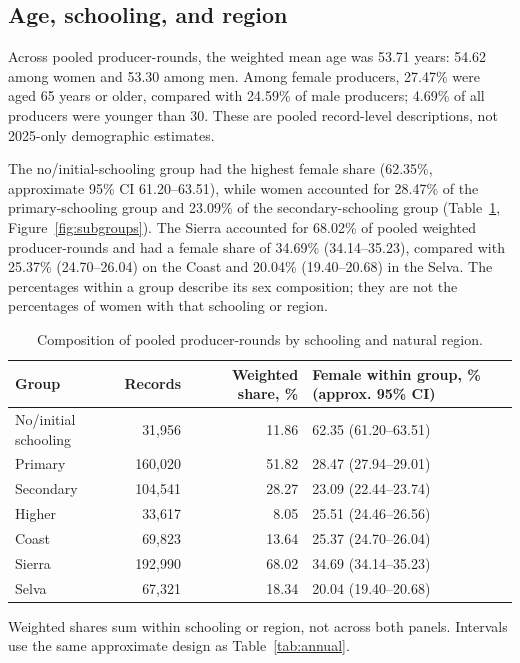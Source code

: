 \documentclass[11pt,a4paper]{article}
\begin{document}
\subsection{Age, schooling, and region}
Across pooled producer-rounds, the weighted mean age was 53.71 years: 54.62 among women and 53.30 among men. Among female producers, 27.47\% were aged 65 years or older, compared with 24.59\% of male producers; 4.69\% of all producers were younger than 30. These are pooled record-level descriptions, not 2025-only demographic estimates.

The no/initial-schooling group had the highest female share (62.35\%, approximate 95\% CI 61.20--63.51), while women accounted for 28.47\% of the primary-schooling group and 23.09\% of the secondary-schooling group (Table~\ref{tab:groups}, Figure~\ref{fig:subgroups}). The Sierra accounted for 68.02\% of pooled weighted producer-rounds and had a female share of 34.69\% (34.14--35.23), compared with 25.37\% (24.70--26.04) on the Coast and 20.04\% (19.40--20.68) in the Selva. The percentages within a group describe its sex composition; they are not the percentages of women with that schooling or region.

\begin{table}[htbp]
\centering\small
\caption{Composition of pooled producer-rounds by schooling and natural region.}
\label{tab:groups}
\begin{tabular}{lrrl}
\toprule
Group & Records & Weighted share, \% & Female within group, \% (approx. 95\% CI) \\
\midrule
No/initial schooling & 31,956 & 11.86 & 62.35 (61.20--63.51) \\
Primary & 160,020 & 51.82 & 28.47 (27.94--29.01) \\
Secondary & 104,541 & 28.27 & 23.09 (22.44--23.74) \\
Higher & 33,617 & 8.05 & 25.51 (24.46--26.56) \\
\midrule
Coast & 69,823 & 13.64 & 25.37 (24.70--26.04) \\
Sierra & 192,990 & 68.02 & 34.69 (34.14--35.23) \\
Selva & 67,321 & 18.34 & 20.04 (19.40--20.68) \\
\bottomrule
\end{tabular}
\begin{minipage}{0.94\textwidth}\footnotesize\vspace{2mm}
Weighted shares sum within schooling or region, not across both panels. Intervals use the same approximate design as Table~\ref{tab:annual}.
\end{minipage}
\end{table}
\end{document}
